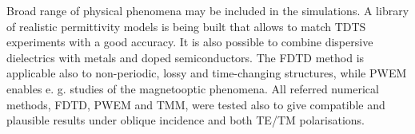 Broad range of physical phenomena may be included in the simulations. A library of realistic permittivity models is being built that allows to match TDTS experiments with a good accuracy. It is also possible to combine dispersive dielectrics with metals and doped semiconductors. 
 The FDTD method is applicable also to non-periodic, lossy and time-changing structures, while PWEM enables e. g. studies of the magnetooptic phenomena.
All referred numerical methods, FDTD, PWEM and TMM, were tested also to give compatible and plausible results under oblique incidence and both TE/TM polarisations. 


